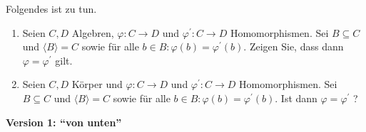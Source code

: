 \begin{exercise}
    Folgendes ist zu tun.
    \begin{enumerate}[label = (\roman*)]
        \item Seien $C,D$ Algebren, $\varphi:C \to D$ und $\varphi^\prime:C \to D$ Homomorphismen. Sei $B \subseteq C$ und $\langle B \rangle = C$ sowie für alle $b \in B: \varphi(b) = \varphi^\prime(b)$. Zeigen Sie, dass dann $\varphi = \varphi^\prime$ gilt.

        \item Seien $C,D$ Körper und  $\varphi:C \to D$ und $\varphi^\prime:C \to D$ Homomorphismen. Sei $B \subseteq C$ und $\langle B \rangle = C$ sowie für alle $b \in B: \varphi(b) = \varphi^\prime(b)$. Ist dann $\varphi = \varphi^\prime$ ?
    \end{enumerate}
\end{exercise}
\textbf{Version 1: ``von unten''}
